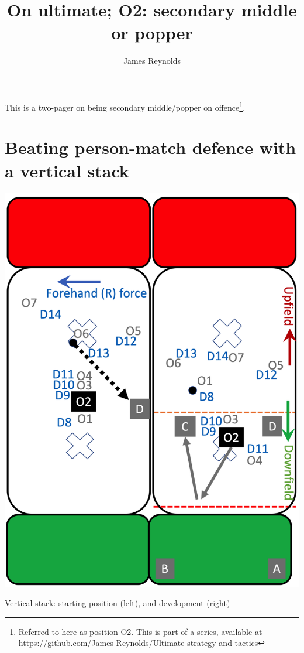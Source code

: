 \documentclass{tufte-handout}
\title{On ultimate; O2: secondary middle or popper}
\author[James Reynolds]{James Reynolds}
\begin{document}
\maketitle%
This is 
a two-pager 
on being 
secondary middle/popper
on offence\footnote{
Referred to here 
as position O2.
This
is part of a series, 
available at
\url{https://github.com/James-Reynolds/Ultimate-strategy-and-tactics}}. 

\section{Beating person-match defence with a vertical stack}\label{sec:vertical}

\begin{marginfigure}%
  \includegraphics[width=\linewidth]{O2-vertical}
  \caption{Vertical stack: 
  starting position (left),
  and development (right)}
  \label{fig:O2-vertical}
\end{marginfigure}
\end{document}
